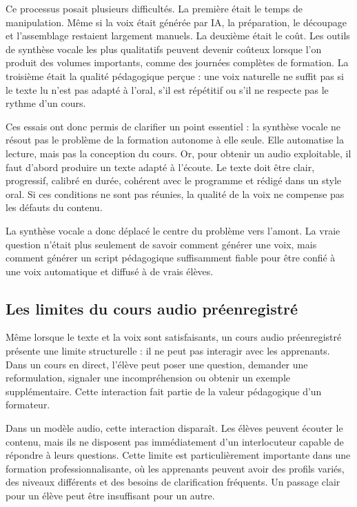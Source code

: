 Ce processus posait plusieurs difficultés. La première était le temps de manipulation.
Même si la voix était générée par IA, la préparation, le découpage et l'assemblage restaient
largement manuels. La deuxième était le coût. Les outils de synthèse vocale les plus
qualitatifs peuvent devenir coûteux lorsque l'on produit des volumes importants, comme
des journées complètes de formation. La troisième était la qualité pédagogique perçue :
une voix naturelle ne suffit pas si le texte lu n'est pas adapté à l'oral, s'il est répétitif ou
s'il ne respecte pas le rythme d'un cours.

Ces essais ont donc permis de clarifier un point essentiel : la synthèse vocale ne résout
pas le problème de la formation autonome à elle seule. Elle automatise la lecture, mais
pas la conception du cours. Or, pour obtenir un audio exploitable, il faut d'abord produire
un texte adapté à l'écoute. Le texte doit être clair, progressif, calibré en durée, cohérent
avec le programme et rédigé dans un style oral. Si ces conditions ne sont pas réunies, la
qualité de la voix ne compense pas les défauts du contenu.

La synthèse vocale a donc déplacé le centre du problème vers l'amont. La vraie question
n'était plus seulement de savoir comment générer une voix, mais comment générer un
script pédagogique suffisamment fiable pour être confié à une voix automatique et diffusé
à de vrais élèves.

\subsection{Les limites du cours audio préenregistré}

Même lorsque le texte et la voix sont satisfaisants, un cours audio préenregistré présente
une limite structurelle : il ne peut pas interagir avec les apprenants. Dans un cours en
direct, l'élève peut poser une question, demander une reformulation, signaler une
incompréhension ou obtenir un exemple supplémentaire. Cette interaction fait partie de
la valeur pédagogique d'un formateur.

Dans un modèle audio, cette interaction disparaît. Les élèves peuvent écouter le contenu,
mais ils ne disposent pas immédiatement d'un interlocuteur capable de répondre à leurs
questions. Cette limite est particulièrement importante dans une formation
professionnalisante, où les apprenants peuvent avoir des profils variés, des niveaux
différents et des besoins de clarification fréquents. Un passage clair pour un élève peut
être insuffisant pour un autre.

